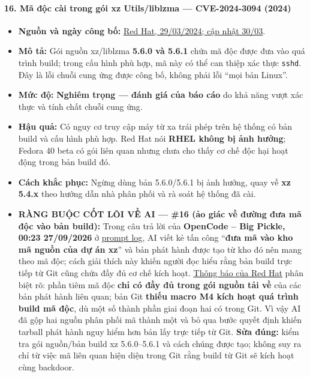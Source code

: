 \paragraph{16. Mã độc cài trong gói xz Utils/liblzma --- CVE-2024-3094 (2024)}\label{muxe3-ux111ux1ed9c-cuxe0i-trong-guxf3i-xz-utilsliblzma-cve-2024-3094-2024}

\begin{itemize}
\tightlist
\item
  \textbf{Nguồn và ngày công bố:} \href{https://www.redhat.com/en/blog/urgent-security-alert-fedora-40-and-rawhide-users}{Red Hat, 29/03/2024; cập nhật 30/03}.
\item
  \textbf{Mô tả:} Gói nguồn xz/liblzma \textbf{5.6.0 và 5.6.1} chứa mã độc được đưa vào quá trình build; trong cấu hình phù hợp, mã này có thể can thiệp xác thực \texttt{sshd}. Đây là lỗi chuỗi cung ứng được công bố, không phải lỗi ``mọi bản Linux''.
\item
  \textbf{Mức độ:} \textbf{Nghiêm trọng --- đánh giá của báo cáo} do khả năng vượt xác thực và tính chất chuỗi cung ứng.
\item
  \textbf{Hậu quả:} Có nguy cơ truy cập máy từ xa trái phép trên hệ thống có bản build và cấu hình phù hợp. Red Hat nói \textbf{RHEL không bị ảnh hưởng}; Fedora 40 beta có gói liên quan nhưng chưa cho thấy cơ chế độc hại hoạt động trong bản build đó.
\item
  \textbf{Cách khắc phục:} Ngừng dùng bản 5.6.0/5.6.1 bị ảnh hưởng, quay về \textbf{xz 5.4.x} theo hướng dẫn nhà phân phối và rà soát hệ thống đã cài.
\item
  \textbf{RÀNG BUỘC CỐT LÕI VỀ AI --- \#16 (ảo giác về đường đưa mã độc vào bản build):} Trong câu trả lời của \textbf{OpenCode -- Big Pickle, 00:23 27/09/2026} ở \href{Appendix_A_Prompt_Log.md}{prompt log}, AI viết kẻ tấn công ``\textbf{đưa mã vào kho mã nguồn của dự án xz}'' và bản phát hành được tạo từ kho đó nên mang theo mã độc; cách giải thích này khiến người đọc hiểu rằng bản build trực tiếp từ Git cũng chứa đầy đủ cơ chế kích hoạt. \href{https://www.redhat.com/en/blog/urgent-security-alert-fedora-40-and-rawhide-users}{Thông báo của Red Hat} phân biệt rõ: phần tiêm mã độc \textbf{chỉ có đầy đủ trong gói nguồn tải về} của các bản phát hành liên quan; bản Git \textbf{thiếu macro M4 kích hoạt quá trình build mã độc}, dù một số thành phần giai đoạn hai có trong Git. Vì vậy AI đã gộp hai nguồn phân phối mã thành một và bỏ qua bước quyết định khiến tarball phát hành nguy hiểm hơn bản lấy trực tiếp từ Git. \textbf{Sửa đúng:} kiểm tra gói nguồn/bản build xz 5.6.0--5.6.1 và cách chúng được tạo; không suy ra chỉ từ việc mã liên quan hiện diện trong Git rằng build từ Git sẽ kích hoạt cùng backdoor.
\end{itemize}

